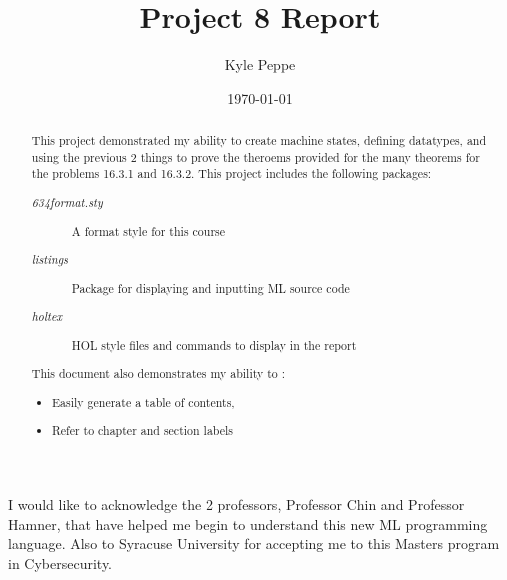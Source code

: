 \documentclass{report}
\title{Project 8 Report}
\author{Kyle Peppe}
\date{\today}
\begin{document}
\lstset{language=ML}


\maketitle{}

\begin{abstract}
  This project demonstrated my ability to create machine states,
  defining datatypes, and using the previous 2 things to prove the
  theroems provided for the many theorems for the problems 16.3.1 and
  16.3.2. This project includes the following packages:
	\begin{description}
		\item[\emph{634format.sty}] A format style for this course
		\item[\emph{listings}] Package for displaying and inputting ML source code
		\item[\emph{holtex}] HOL style files and commands to display in the report
	\end{description}
        This document also demonstrates my ability to :
	\begin{itemize}
		\item Easily generate a table of contents,
		\item Refer to chapter and section labels
	\end{itemize}
\end{abstract}

\tableofcontents{}

\begin{acknowledgments}
  I would like to acknowledge the 2 professors, Professor Chin and 
  Professor Hamner, that have helped me begin to understand this new
  ML programming language. Also to Syracuse University for accepting
  me to this Masters program in Cybersecurity.
\end{acknowledgments}
\end{document}
